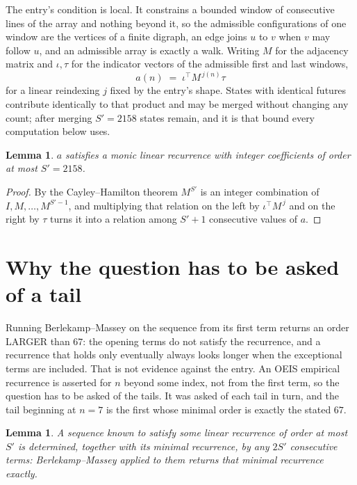 \documentclass[11pt,a4paper]{article}
\theoremstyle{plain}
\newtheorem{lemma}[theorem]{Lemma}
\theoremstyle{definition}
\begin{document}
The entry's condition is local. It constrains a bounded window of consecutive lines of the
array and nothing beyond it, so the admissible configurations of one window are the vertices of
a finite digraph, an edge joins $u$ to $v$ when $v$ may follow $u$, and an admissible array is
exactly a walk. Writing $M$ for the adjacency matrix and $\iota,\tau$ for the indicator vectors
of the admissible first and last windows,
\[
a(n)\;=\;\iota^{\!\top}M^{\,j(n)}\tau
\]
for a linear reindexing $j$ fixed by the entry's shape. States with identical futures
contribute identically to that product and may be merged without changing any count; after
merging $S'=2158$ states remain, and it is that bound every computation below uses.

\begin{lemma}\label{lem:cf}
$a$ satisfies a monic linear recurrence with integer coefficients of order at most $S'=2158$.
\end{lemma}

\begin{proof}
By the Cayley--Hamilton theorem $M^{S'}$ is an integer combination of $I,M,\dots,M^{S'-1}$,
and multiplying that relation on the left by $\iota^{\!\top}M^{\,j}$ and on the right by
$\tau$ turns it into a relation among $S'+1$ consecutive values of $a$.
\end{proof}

\section{Why the question has to be asked of a tail}

Running Berlekamp--Massey on the sequence from its first term returns an order LARGER than $67$: the opening terms do not satisfy the recurrence, and a recurrence that holds only eventually always looks longer when the exceptional terms are included. That is not evidence against the entry. An OEIS empirical recurrence is asserted for $n$ beyond some index, not from the first term, so the question has to be asked of the tails. It was asked of each tail in turn, and the tail beginning at $n=7$ is the first whose minimal order is exactly the stated $67$.

\begin{lemma}\label{lem:bm}
A sequence known to satisfy some linear recurrence of order at most $S'$ is determined,
together with its minimal recurrence, by any $2S'$ consecutive terms: Berlekamp--Massey applied
to them returns that minimal recurrence exactly.
\end{lemma}
\end{document}
